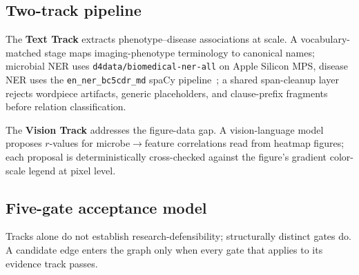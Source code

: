 \documentclass[10pt,twocolumn,letterpaper]{article}
\begin{document}
\subsection{Two-track pipeline}

The \textbf{Text Track} extracts phenotype--disease associations at scale. A
vocabulary-matched stage maps imaging-phenotype terminology to canonical
names; microbial NER uses \texttt{d4data/biomedical-ner-all} on Apple Silicon
MPS, disease NER uses the \texttt{en\_ner\_bc5cdr\_md} spaCy
pipeline~\cite{neumann2019scispacy,li2016bc5cdr}; a shared span-cleanup
layer rejects wordpiece artifacts, generic placeholders, and clause-prefix
fragments before relation classification.

The \textbf{Vision Track} addresses the figure-data gap. A vision-language
model proposes $r$-values for microbe$\rightarrow$feature correlations read
from heatmap figures; each proposal is deterministically cross-checked
against the figure's gradient color-scale legend at pixel level.

\subsection{Five-gate acceptance model}
\label{sec:gates}

Tracks alone do not establish research-defensibility; structurally distinct
gates do. A candidate edge enters the graph only when every gate that applies
to its evidence track passes.
\end{document}
